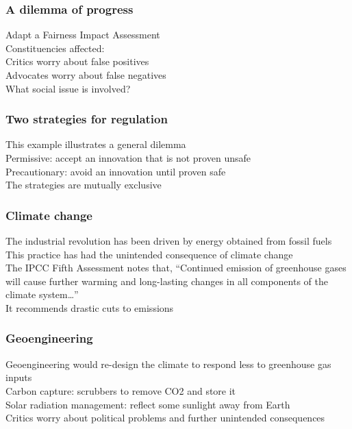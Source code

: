 \documentclass{article}
\begin{document}
\subsubsection*{A dilemma of progress}
\label{ssub:a_dilemma_of_progress}
Adapt a Fairness Impact Assessment\\
Constituencies affected:\\
Critics worry about false positives\\
Advocates worry about false negatives\\
What social issue is involved?\\
\subsubsection*{Two strategies for regulation}
\label{ssub:two_strategies_for_regulation}
This example illustrates a general dilemma\\
Permissive: accept an innovation that is not proven unsafe\\
Precautionary: avoid an innovation until proven safe\\
The strategies are mutually exclusive\\
\subsubsection*{Climate change}
\label{ssub:climate_change}
The industrial revolution has been driven by energy obtained from fossil fuels\\
This practice has had the unintended consequence of climate change\\
The IPCC Fifth Assessment notes that, “Continued emission of greenhouse gases will cause further warming and long-lasting changes in all components of the climate system…”\\
It recommends drastic cuts to emissions\\
\subsubsection*{Geoengineering}
\label{ssub:geoengineering}
Geoengineering would re-design the climate to respond less to greenhouse gas inputs\\
Carbon capture: scrubbers to remove CO2 and store it\\
Solar radiation management: reflect some sunlight away from Earth\\
Critics worry about political problems and further unintended consequences\\
\end{document}
